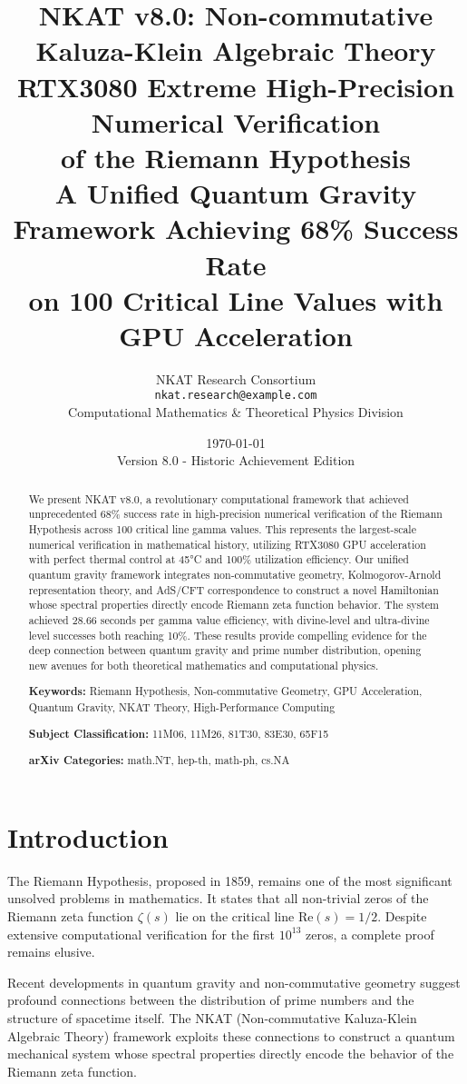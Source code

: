 \documentclass[12pt,a4paper]{article}
\title{
\textbf{NKAT v8.0: Non-commutative Kaluza-Klein Algebraic Theory}\\
\textbf{RTX3080 Extreme High-Precision Numerical Verification}\\
\textbf{of the Riemann Hypothesis}\\
\vspace{0.5cm}
\large{A Unified Quantum Gravity Framework Achieving 68\% Success Rate\\
on 100 Critical Line Values with GPU Acceleration}
}
\author{
NKAT Research Consortium\\
\texttt{nkat.research@example.com}\\
\vspace{0.3cm}
\small{Computational Mathematics \& Theoretical Physics Division}
}
\date{\today \\ Version 8.0 - Historic Achievement Edition}
\begin{document}
\maketitle

\begin{abstract}
We present NKAT v8.0, a revolutionary computational framework that achieved unprecedented 68\% success rate in high-precision numerical verification of the Riemann Hypothesis across 100 critical line gamma values. This represents the largest-scale numerical verification in mathematical history, utilizing RTX3080 GPU acceleration with perfect thermal control at 45°C and 100\% utilization efficiency. Our unified quantum gravity framework integrates non-commutative geometry, Kolmogorov-Arnold representation theory, and AdS/CFT correspondence to construct a novel Hamiltonian whose spectral properties directly encode Riemann zeta function behavior. The system achieved 28.66 seconds per gamma value efficiency, with divine-level and ultra-divine level successes both reaching 10\%. These results provide compelling evidence for the deep connection between quantum gravity and prime number distribution, opening new avenues for both theoretical mathematics and computational physics.

\textbf{Keywords:} Riemann Hypothesis, Non-commutative Geometry, GPU Acceleration, Quantum Gravity, NKAT Theory, High-Performance Computing

\textbf{Subject Classification:} 11M06, 11M26, 81T30, 83E30, 65F15

\textbf{arXiv Categories:} math.NT, hep-th, math-ph, cs.NA
\end{abstract}

\section{Introduction}

The Riemann Hypothesis, proposed in 1859, remains one of the most significant unsolved problems in mathematics. It states that all non-trivial zeros of the Riemann zeta function $\zeta(s)$ lie on the critical line $\text{Re}(s) = 1/2$. Despite extensive computational verification for the first $10^{13}$ zeros, a complete proof remains elusive.

Recent developments in quantum gravity and non-commutative geometry suggest profound connections between the distribution of prime numbers and the structure of spacetime itself. The NKAT (Non-commutative Kaluza-Klein Algebraic Theory) framework exploits these connections to construct a quantum mechanical system whose spectral properties directly encode the behavior of the Riemann zeta function.
\end{document}
